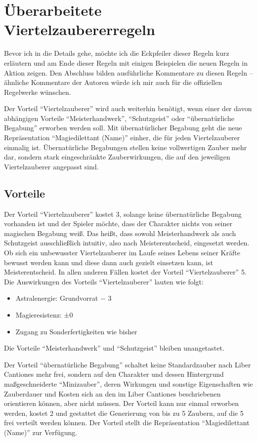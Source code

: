 \section{Überarbeitete Viertelzaubererregeln}
Bevor ich in die Details gehe, möchte ich die Eckpfeiler dieser Regeln kurz erläutern und am Ende dieser Regeln mit einigen Beispielen die neuen Regeln in Aktion zeigen. Den Abschluss bilden ausführliche Kommentare zu diesen Regeln -- ähnliche Kommentare der Autoren würde ich mir auch für die offiziellen Regelwerke wünschen.

Der Vorteil \enquote{Viertelzauberer} wird auch weiterhin benötigt, wenn einer der davon abhängigen Vorteile \enquote{Meisterhandwerk}, \enquote{Schutzgeist} oder \enquote{übernatürliche Begabung} erworben werden soll. Mit übernatürlicher Begabung geht die neue Repräsentation \enquote{Magiedilettant (Name)} einher, die für jeden Viertelzauberer einmalig ist. Übernatürliche Begabungen stellen keine vollwertigen Zauber mehr dar, sondern stark eingeschränkte Zauberwirkungen, die auf den jeweiligen Viertelzauberer angepasst sind.

\subsection{Vorteile}
Der Vorteil \enquote{Viertelzauberer} kostet \SI{3}{\GP}, solange keine übernatürliche Begabung vorhanden ist und der Spieler möchte, dass der Charakter nichts von seiner magischen Begabung weiß. Das heißt, dass sowohl Meisterhandwerk als auch Schutzgeist ausschließlich intuitiv, also nach Meisterentscheid, eingesetzt werden. Ob sich ein unbewusster Viertelzauberer im Laufe seines Lebens seiner Kräfte bewusst werden kann und diese dann auch gezielt einsetzen kann, ist Meisterentscheid. In allen anderen Fällen kostet der Vorteil \enquote{Viertelzauberer} \SI{5}{\GP}. Die Auswirkungen des Vorteils \enquote{Viertelzauberer} lauten wie folgt:
\begin{itemize}
	\item Astralenergie: Grundvorrat − \SI{3}{\AsP}
	\item Magieresistenz: ±0
	\item Zugang zu Sonderfertigkeiten wie bisher
\end{itemize}
Die Vorteile \enquote{Meisterhandwerk} und \enquote{Schutzgeist} bleiben unangetastet.

Der Vorteil \enquote{übernatürliche Begabung} schaltet keine Standardzauber nach Liber Cantiones mehr frei, sondern auf den Charakter und dessen Hintergrund maßgeschneiderte \enquote{Minizauber}, deren Wirkungen und sonstige Eigenschaften wie Zauberdauer und Kosten sich an den im Liber Cantiones beschriebenen orientieren können, aber nicht müssen. Der Vorteil kann nur einmal erworben werden, kostet \SI{2}{\GP} und gestattet die Generierung von bis zu 5 Zaubern, auf die \SI{5}{\ZfP} frei verteilt werden können. Der Vorteil stellt die Repräsentation \enquote{Magiedilettant (Name)} zur Verfügung.

